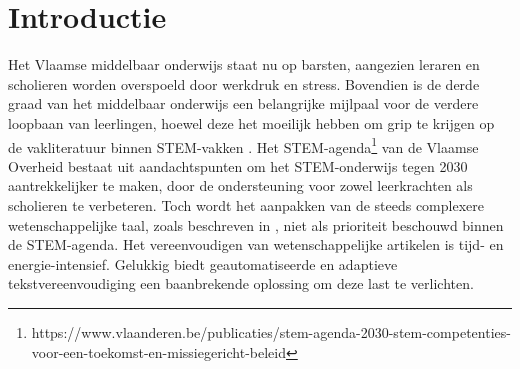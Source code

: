 
\section{Introductie}%
\label{sec:introductie}


Het Vlaamse middelbaar onderwijs staat nu op barsten, aangezien leraren en scholieren worden overspoeld door werkdruk en stress. Bovendien is de derde graad van het middelbaar onderwijs een belangrijke mijlpaal voor de verdere loopbaan van leerlingen, hoewel deze het moeilijk hebben om grip te krijgen op de vakliteratuur binnen STEM-vakken \autocite{Dapaah2022}. Het STEM-agenda\footnote{https://www.vlaanderen.be/publicaties/stem-agenda-2030-stem-competenties-voor-een-toekomst-en-missiegericht-beleid} van de Vlaamse Overheid bestaat uit aandachtspunten om het STEM-onderwijs tegen 2030 aantrekkelijker te maken, door de ondersteuning voor zowel leerkrachten als scholieren te verbeteren. Toch wordt het aanpakken van de steeds complexere wetenschappelijke taal, zoals beschreven in \textcite{Barnett2020}, niet als prioriteit beschouwd binnen de STEM-agenda. Het vereenvoudigen van wetenschappelijke artikelen is tijd- en energie-intensief. Gelukkig biedt geautomatiseerde en adaptieve tekstvereenvoudiging een baanbrekende oplossing om deze last te verlichten.

